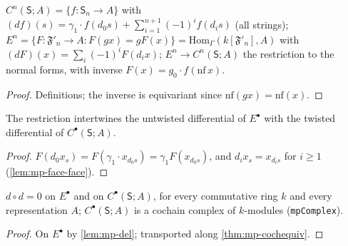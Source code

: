 \begin{definition}\label{def:mp-cochains}
  \leanok
  $C^n(\mathsf S;A)=\{f\colon\mathsf S_n\to A\}$ with $(df)(s)=\gamma_1\cdot f(d_0s)+\sum_{i=1}^{n+1}(-1)^if(d_is)$ (all strings);
  $E^n=\{F\colon\mathfrak F'_n\to A:F(gx)=gF(x)\}=\mathrm{Hom}_\Gamma(k[\mathfrak F'_n],A)$ with $(dF)(x)=\sum_i(-1)^iF(d_ix)$;
  $E^n\to C^n(\mathsf S;A)$ the restriction to the normal forms, with inverse $F(x)=g_0\cdot f(\mathrm{nf}\,x)$.
\end{definition}
\begin{proof}
  \leanok
  Definitions; the inverse is equivariant since $\mathrm{nf}(gx)=\mathrm{nf}(x)$.
\end{proof}

\begin{theorem}[{$\mathrm{Hom}_\Gamma(k[\mathfrak F'_\bullet],A)=C^\bullet(\mathsf S;A)$ on the nose}]\label{thm:mp-cochequiv}
  \leanok
  The restriction intertwines the untwisted differential of $E^\bullet$ with the twisted differential of $C^\bullet(\mathsf S;A)$.
\end{theorem}
\begin{proof}
  \leanok
  $F(d_0x_s)=F(\gamma_1\cdot x_{d_0s})=\gamma_1F(x_{d_0s})$, and $d_ix_s=x_{d_is}$ for $i\ge1$ (\ref{lem:mp-face-face}).
\end{proof}

\begin{theorem}[$d\circ d=0$; the MP complex]\label{thm:mp-dd}
  \leanok
  $d\circ d=0$ on $E^\bullet$ and on $C^\bullet(\mathsf S;A)$, for every commutative ring $k$ and every representation $A$;
  $C^\bullet(\mathsf S;A)$ is a cochain complex of $k$-modules (\texttt{mpComplex}).
\end{theorem}
\begin{proof}
  \leanok
  On $E^\bullet$ by \ref{lem:mp-del}; transported along \ref{thm:mp-cochequiv}.
\end{proof}

